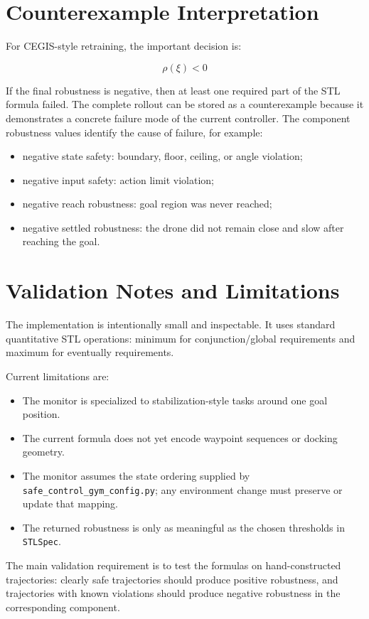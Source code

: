 \documentclass[11pt]{article}
\newcommand{\code}[1]{\texttt{#1}}
\newcommand{\rob}{\rho}
\newcommand{\traj}{\xi}
\begin{document}
\section{Counterexample Interpretation}

For CEGIS-style retraining, the important decision is:

\[
\rob(\traj) < 0
\]

If the final robustness is negative, then at least one required part of the STL formula failed. The complete rollout can be stored as a counterexample because it demonstrates a concrete failure mode of the current controller. The component robustness values identify the cause of failure, for example:

\begin{itemize}
  \item negative state safety: boundary, floor, ceiling, or angle violation;
  \item negative input safety: action limit violation;
  \item negative reach robustness: goal region was never reached;
  \item negative settled robustness: the drone did not remain close and slow after reaching the goal.
\end{itemize}

\section{Validation Notes and Limitations}

The implementation is intentionally small and inspectable. It uses standard quantitative STL operations: minimum for conjunction/global requirements and maximum for eventually requirements.

Current limitations are:

\begin{itemize}
  \item The monitor is specialized to stabilization-style tasks around one goal position.
  \item The current formula does not yet encode waypoint sequences or docking geometry.
  \item The monitor assumes the state ordering supplied by \code{safe\_control\_gym\_config.py}; any environment change must preserve or update that mapping.
  \item The returned robustness is only as meaningful as the chosen thresholds in \code{STLSpec}.
\end{itemize}

The main validation requirement is to test the formulas on hand-constructed trajectories: clearly safe trajectories should produce positive robustness, and trajectories with known violations should produce negative robustness in the corresponding component.
\end{document}

